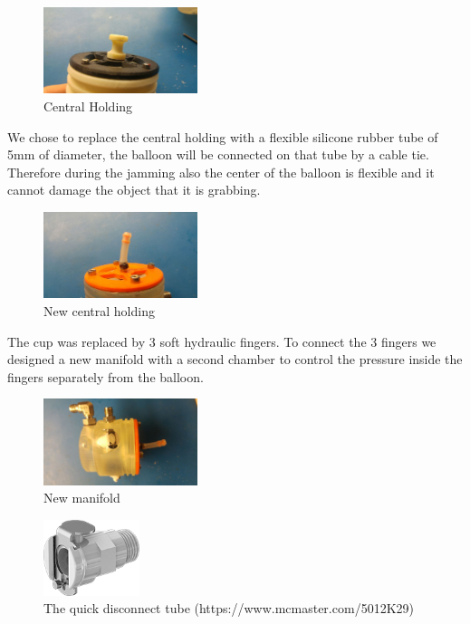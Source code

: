 \documentclass{article}
\begin{document}
\begin{figure}[h]
    \centering
    \includegraphics[width=0.4\textwidth]{Pictures/fingerOnToroidal/centralHolding.jpg}
    \caption{Central Holding}
    \label{fig:centralHolding}
\end{figure}

We chose to replace the central holding with a flexible silicone rubber tube of 5mm of diameter, the balloon will be connected on that tube by a cable tie. Therefore during the jamming also the center of the balloon is flexible and it cannot damage the object that it is grabbing.

\begin{figure}[h]
    \centering
    \includegraphics[width=0.4\textwidth]{Pictures/fingerOnToroidal/NewCentralHolding.jpg}
    \caption{New central holding}
    \label{fig:newCentralHolding}
\end{figure}

The cup was replaced by 3 soft hydraulic fingers. To connect the 3 fingers we designed a new manifold with a second chamber to control the pressure inside the fingers separately from the balloon.

\begin{figure}[h]
    \centering
    \includegraphics[width=0.4\textwidth]{Pictures/fingerOnToroidal/NewManifold.jpg}
    \caption{New manifold}
    \label{fig:newManifold}
\end{figure}

\begin{figure}[h]
    \centering
    \includegraphics[width=0.25\textwidth]{Pictures/fingerOnToroidal/Plastic_quick_disconnect_tube.png}
    \caption{The quick disconnect tube (https://www.mcmaster.com/5012K29)}
    \label{fig:quickDisconnector}
\end{figure}
\end{document}
